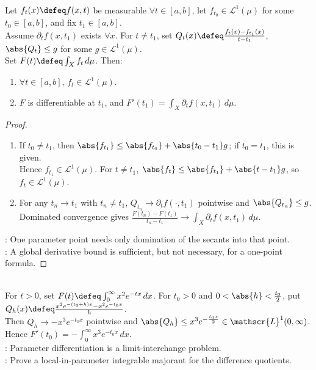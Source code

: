 \begin{corollary} \label{cor:single-point-differentiation-under-lebesgue-integral} \\
Let $f_t(x)\defeq f(x,t)$ be measurable $\forall t\in[a,b]$, let $f_{t_0}\in\mathscr{L}^1(\mu)$ for some $t_0\in[a,b]$, and fix $t_1\in[a,b]$.\\
Assume $\partial_tf(x,t_1)$ exists $\forall x$. For $t\neq t_1$, set $Q_t(x)\defeq\frac{f_t(x)-f_{t_1}(x)}{t-t_1}$, $\abs{Q_t}\leq g$ for some $g\in\mathscr{L}^1(\mu)$.\\
Set $F(t)\defeq\int_Xf_t\,d\mu$. Then:
\begin{enumerate}[label=(\roman*)]
\setlength{\itemsep}{0pt}
\item $\forall t\in[a,b]$, $f_t\in\mathscr{L}^1(\mu)$.
\item $F$ is differentiable at $t_1$, and $F'(t_1)=\int_X\partial_tf(x,t_1)\,d\mu$.
\end{enumerate}
\begin{proof}
\begin{enumerate}[label=(\roman*)]
\setlength{\itemsep}{0pt}
\item If $t_0\neq t_1$, then $\abs{f_{t_1}}\leq\abs{f_{t_0}}+\abs{t_0-t_1}g$; if $t_0=t_1$, this is given.\\
Hence $f_{t_1}\in\mathscr{L}^1(\mu)$. For $t\neq t_1$, $\abs{f_t}\leq\abs{f_{t_1}}+\abs{t-t_1}g$, so $f_t\in\mathscr{L}^1(\mu)$.
\item For any $t_n\to t_1$ with $t_n\neq t_1$, $Q_{t_n}\to\partial_tf(\cdot,t_1)$ pointwise and $\abs{Q_{t_n}}\leq g$.\\
Dominated convergence gives $\frac{F(t_n)-F(t_1)}{t_n-t_1}\to\int_X\partial_tf(x,t_1)\,d\mu$.
\end{enumerate}
: One parameter point needs only domination of the secants into that point.\\
: A global derivative bound is sufficient, but not necessary, for a one-point formula.
\end{proof}
\end{corollary}

\begin{example} \label{ex:differentiating-under-integral-dominated-convergence} \\
For $t>0$, set $F(t)\defeq\int_0^\infty x^2e^{-tx}\,dx$. For $t_0>0$ and $0<\abs{h}<\frac{t_0}{2}$, put $Q_h(x)\defeq\frac{x^2e^{-(t_0+h)x}-x^2e^{-t_0x}}{h}$.\\
Then $Q_h\to -x^3e^{-t_0x}$ pointwise and $\abs{Q_h}\leq x^3e^{-\frac{t_0x}{2}}\in\mathscr{L}^1(0,\infty)$. Hence $F'(t_0)=-\int_0^\infty x^3e^{-t_0x}\,dx$.\\
: Parameter differentiation is a limit-interchange problem.\\
: Prove a local-in-parameter integrable majorant for the difference quotients.
\end{example}

